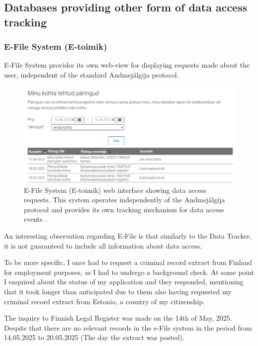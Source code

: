 \subsection{Databases providing other form of data access tracking}

\subsubsection{E-File System (E-toimik)}
E-File System provides its own web-view for displaying requests made about the user, independent of the standard Andmejälgija protocol.

\begin{figure}[H]
\centering
\includegraphics[width=450px]{english/figures/e-toimik.png}
\caption{E-File System (E-toimik) web interface showing data access requests. This system operates independently of the Andmejälgija protocol and provides its own tracking mechanism for data access events \cite{e-toimik-screenshot}.}
\label{fig:e-toimik}
\end{figure}

An interesting observation regarding E-File is that similarly to the Data Tracker, it is not guaranteed to include all information about data access.

To be more specific, I once had to request a criminal record extract from Finland for employment purposes, as I had to undergo a background check. At some point I enquired about the status of my application and they responded, mentioning that it took longer than anticipated due to them also having requested my criminal record extract from Estonia, a country of my citizenship.

The inquiry to Finnish Legal Register was made on the 14th of May, 2025. Despite that there are no relevant records in the e-File system in the period from 14.05.2025 to 20.05.2025 (The day the extract was posted).

